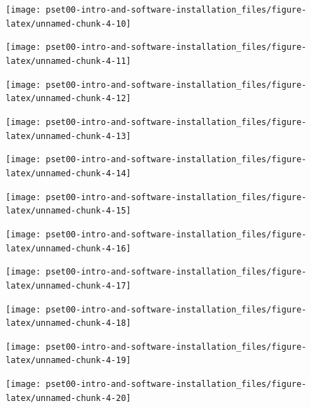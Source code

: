 \documentclass[
]{article}
\begin{document}
\begin{center}\texttt{[image: pset00-intro-and-software-installation\_files/figure-latex/unnamed-chunk-4-10]} \end{center}

\begin{center}\texttt{[image: pset00-intro-and-software-installation\_files/figure-latex/unnamed-chunk-4-11]} \end{center}

\begin{center}\texttt{[image: pset00-intro-and-software-installation\_files/figure-latex/unnamed-chunk-4-12]} \end{center}

\begin{center}\texttt{[image: pset00-intro-and-software-installation\_files/figure-latex/unnamed-chunk-4-13]} \end{center}

\begin{center}\texttt{[image: pset00-intro-and-software-installation\_files/figure-latex/unnamed-chunk-4-14]} \end{center}

\begin{center}\texttt{[image: pset00-intro-and-software-installation\_files/figure-latex/unnamed-chunk-4-15]} \end{center}

\begin{center}\texttt{[image: pset00-intro-and-software-installation\_files/figure-latex/unnamed-chunk-4-16]} \end{center}

\begin{center}\texttt{[image: pset00-intro-and-software-installation\_files/figure-latex/unnamed-chunk-4-17]} \end{center}

\begin{center}\texttt{[image: pset00-intro-and-software-installation\_files/figure-latex/unnamed-chunk-4-18]} \end{center}

\begin{center}\texttt{[image: pset00-intro-and-software-installation\_files/figure-latex/unnamed-chunk-4-19]} \end{center}

\begin{center}\texttt{[image: pset00-intro-and-software-installation\_files/figure-latex/unnamed-chunk-4-20]} \end{center}
\end{document}
